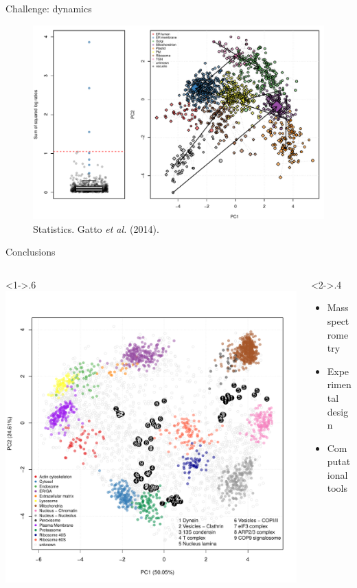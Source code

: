 \documentclass[presentation]{beamer}
\begin{document}
\begin{frame}{Challenge: dynamics}
  \begin{figure}[h]
    \centering
    \includegraphics[width=.9\linewidth]{./figures/transloc-dynamics2.pdf}
    \caption{Statistics. Gatto \textit{et al.} (2014). }
  \end{figure}
\end{frame}
 
\begin{frame}{Conclusions}
  \begin{columns}
    \begin{column}<1->{.6\textwidth}
      \includegraphics[width=1\linewidth]{./figures/fusfoi.pdf}
    \end{column}
    \begin{column}<2->{.4\textwidth}
      \begin{itemize}
      \item Mass spectrometry
      \item Experimental design
      \item Computational tools
      \end{itemize}
    \end{column}
  \end{columns}

\end{frame}
\end{document}

